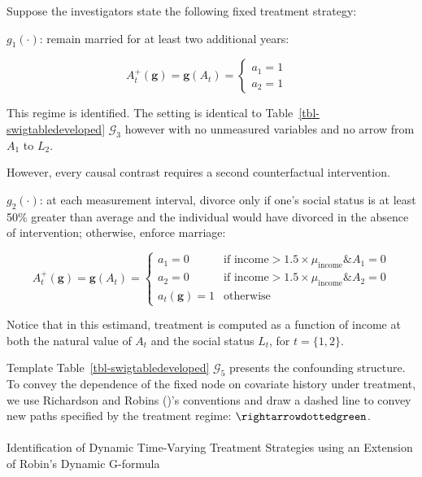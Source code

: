 \documentclass[
  single column]{article}
\makeatletter
\let\oldparagraph\paragraph
\renewcommand{\paragraph}{
    \@ifstar
      \xxxParagraphStar
      \xxxParagraphNoStar
  }
\newcommand{\xxxParagraphStar}[1]{\oldparagraph*{#1}\mbox{}}
\newcommand{\xxxParagraphNoStar}[1]{\oldparagraph{#1}\mbox{}}
\makeatother
\begin{document}
Suppose the investigators state the following fixed treatment strategy:

\(g_1(\cdot)\): remain married for at least two additional years:

\[
A_t^{+}(\mathbf{g}) = \mathbf{g}(A_{t}) = \begin{cases} 
   a_{1} = 1 & \\ 
   a_{2} = 1 &   
\end{cases}
\]

This regime is identified. The setting is identical to
Table~\ref{tbl-swigtabledeveloped} \(\mathcal{G}_3\) however with no
unmeasured variables and no arrow from \(A_1\) to \(L_2\).

However, every causal contrast requires a second counterfactual
intervention.

\(g_2(\cdot)\): at each measurement interval, divorce only if one's
social status is at least 50\% greater than average and the individual
would have divorced in the absence of intervention; otherwise, enforce
marriage:

\[
A_t^{+}(\mathbf{g}) = \mathbf{g}(A_{t}) = \begin{cases} 
   a_{1} = 0 & \text{if income} > 1.5 \times  \mu_{\text{income}} \& A_1 = 0 \\ 
   a_{2} = 0 & \text{if income} > 1.5 \times  \mu_{\text{income}} \& A_2 = 0 \\ 
   a_{t}(\mathbf{g}) = 1 & \text{otherwise} 
\end{cases}
\]

Notice that in this estimand, treatment is computed as a function of
income at both the natural value of \(A_t\) and the social status
\(L_t\), for \(t = \{1,2\}\).

Template Table~\ref{tbl-swigtabledeveloped} \(\mathcal{G}_5\) presents
the confounding structure. To convey the dependence of the fixed node on
covariate history under treatment, we use Richardson and Robins
()'s conventions and draw a dashed
line to convey new paths specified by the treatment regime:
\(\rightarrowdottedgreen\).

\paragraph{Identification of Dynamic Time-Varying Treatment Strategies
using an Extension of Robin's Dynamic
G-formula}\label{identification-of-dynamic-time-varying-treatment-strategies-using-an-extension-of-robins-dynamic-g-formula}
\end{document}
